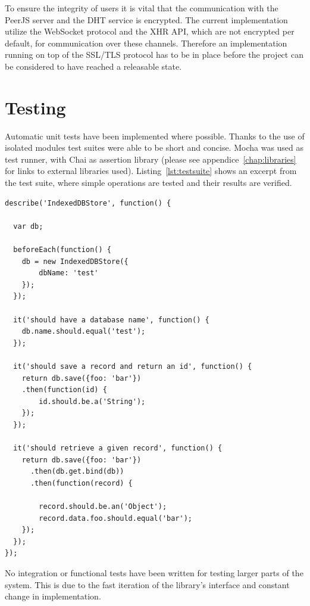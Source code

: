 To ensure the integrity of users it is vital that the communication with the PeerJS server and the DHT service is encrypted. The current implementation utilize the WebSocket protocol and the XHR API, which are not encrypted per default, for communication over these channels. Therefore an implementation running on top of the SSL/TLS protocol has to be in place before the project can be considered to have reached a releasable state.

\clearpage

\section{Testing}
\label{sec:testing}

Automatic unit tests have been implemented where possible. Thanks to the use of isolated modules test suites were able to be short and concise. Mocha was used as test runner, with Chai as assertion library (please see appendice~\ref{chap:libraries} for links to external libraries used). Listing~\ref{lst:testsuite} shows an excerpt from the test suite, where simple operations are tested and their results are verified.

\begin{Code}
\begin{lstlisting}[caption={Sample test suite}, label={lst:testsuite}]
describe('IndexedDBStore', function() {

  var db;

  beforeEach(function() {
  	db = new IndexedDBStore({
  		dbName: 'test'
  	});
  });

  it('should have a database name', function() {
  	db.name.should.equal('test');
  });

  it('should save a record and return an id', function() {
  	return db.save({foo: 'bar'})
  	.then(function(id) {
  		id.should.be.a('String');
  	});
  });

  it('should retrieve a given record', function() {
  	return db.save({foo: 'bar'})
      .then(db.get.bind(db))
      .then(function(record) {

  		record.should.be.an('Object');
  		record.data.foo.should.equal('bar');
  	});
  });
});
\end{lstlisting}
\end{Code}

No integration or functional tests have been written for testing larger parts of the system. This is due to the fast iteration of the library's interface and constant change in implementation.
